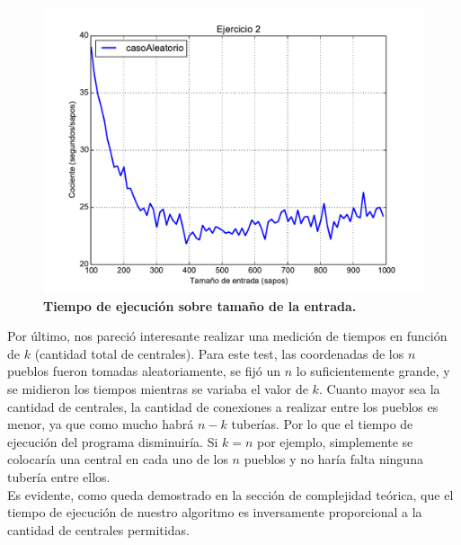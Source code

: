 \documentclass[11pt, a4paper, twoside]{article}
\begin{document}
\begin{figure}[H]
   \begin{center}
   \includegraphics[width=1.4\textwidth,angle=90]{../ej2/graficos/test_Division.pdf}
   \caption{\textbf{Tiempo de ejecución sobre tamaño de la entrada.}}
   \label{fig:ej2-graf-2}
   \end{center}
\end{figure}
\clearpage

Por último, nos pareció interesante realizar una medición de tiempos en función de $k$ (cantidad total de centrales). 
Para este test, las coordenadas de los $n$ pueblos fueron tomadas aleatoriamente, se fijó un $n$ lo 
suficientemente grande, y se midieron los tiempos mientras se variaba el valor de $k$. 
Cuanto mayor sea la cantidad de centrales, la cantidad de conexiones a realizar entre los pueblos es menor, ya que 
como mucho habrá $n - k$ tuberías. Por lo que el tiempo de ejecución del programa disminuiría. 
Si $k = n$ por ejemplo, simplemente se colocaría una central en cada uno de los $n$ pueblos y no haría falta 
ninguna tubería entre ellos.\\
Es evidente, como queda demostrado en la sección de complejidad teórica, que el tiempo de ejecución de nuestro algoritmo es inversamente proporcional a la cantidad de centrales permitidas.
 
\end{document}
